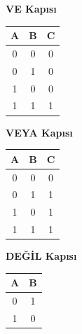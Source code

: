 \begin{table}[H]
\centering
\begin{minipage}{0.3\textwidth}
\centering
\textbf{VE Kapısı}
\vspace{0.3em}

\begin{tabular}{cc|c}
\toprule
\textbf{A} & \textbf{B} & \textbf{C} \\
\midrule
0 & 0 & 0 \\
0 & 1 & 0 \\
1 & 0 & 0 \\
1 & 1 & 1 \\
\bottomrule
\end{tabular}
\end{minipage}
\hfill
\begin{minipage}{0.3\textwidth}
\centering
\textbf{VEYA Kapısı}
\vspace{0.3em}

\begin{tabular}{cc|c}
\toprule
\textbf{A} & \textbf{B} & \textbf{C} \\
\midrule
0 & 0 & 0 \\
0 & 1 & 1 \\
1 & 0 & 1 \\
1 & 1 & 1 \\
\bottomrule
\end{tabular}
\end{minipage}
\hfill
\begin{minipage}{0.3\textwidth}
\centering
\textbf{DEĞİL Kapısı}
\vspace{0.3em}

\begin{tabular}{c|c}
\toprule
\textbf{A} & \textbf{B} \\
\midrule
0 & 1 \\
1 & 0 \\
\bottomrule
\end{tabular}
\end{minipage}
\end{table}

